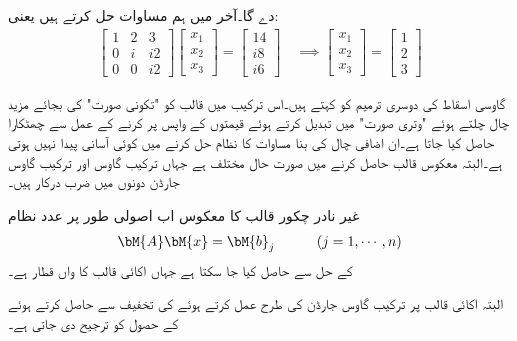 دے گا۔آخر میں ہم مساوات  حل کرتے ہیں یعنی:
\begin{align*}
\begin{bmatrix}
1&2&3\\
0&i&i2\\
0&0&i2
\end{bmatrix}
\begin{bmatrix}
x_1\\
x_2\\
x_3
\end{bmatrix}=
\begin{bmatrix}
14\\
i8\\
i6
\end{bmatrix}\quad\implies
\begin{bmatrix}
x_1\\
x_2\\
x_3
\end{bmatrix}=
\begin{bmatrix}
1\\
2\\
3
\end{bmatrix}
\end{align*}


گاوسی اسقاط کی دوسری ترمیم کو  کہتے ہیں۔اس ترکیب میں قالب کو "تکونی صورت" کی بجائے مزید چال چلتے ہوئے  "وتری صورت" میں تبدیل کرتے ہوئے قیمتوں کے واپس پر کرنے کے عمل سے چھٹکارا حاصل کیا جاتا ہے۔ان اضافی چال کی بنا مساوات کا نظام حل کرنے میں کوئی آسانی پیدا نہیں ہوتی ہے۔البتہ معکوس قالب حاصل کرنے میں صورت حال مختلف ہے جہاں ترکیب گاوس اور ترکیب گاوس جارڈن دونوں میں  ضرب درکار ہیں۔

غیر نادر چکور قالب  کا معکوس اب اصولی طور پر  عدد نظام
\begin{align}\label{مساوات_خطی_اعدادی_شولسکی_ٹ}
\bM{A}\bM{x}=\bM{b}_j\quad \quad \quad (j=1,\cdots,n)
\end{align}
کے حل سے حاصل کیا جا سکتا ہے جہاں  اکائی قالب کا  واں قطار  ہے۔

البتہ اکائی قالب  پر ترکیب گاوس جارڈن کی طرح عمل کرتے ہوئے  کی تخفیف سے   حاصل کرتے ہوئے  کے حصول کو ترجیح دی جاتی ہے۔



